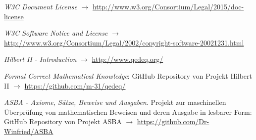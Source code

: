 \documentclass[english,ngerman,parskip=half,headsepline,footsepline]{scrreprt}
\begin{document}
\begin{flushleft}
\begin{thebibliography}{12}
			\emph{W3C Document License} $\rightarrow$ \url{http://www.w3.org/Consortium/Legal/2015/doc-license}
			
			\emph{W3C Software Notice and License} $\rightarrow$ \url{http://www.w3.org/Consortium/Legal/2002/copyright-software-20021231.html}
			
			\emph{Hilbert II - Introduction} $\rightarrow$ \url{http://www.qedeq.org/}
			
			\emph{Formal Correct Mathematical Knowledge}: GitHub Repository von Projekt Hilbert II $\rightarrow$ \url{https://github.com/m-31/qedeq/}
			
			\emph{ASBA - Axiome, Sätze, Beweise und Ausgaben}. Projekt zur maschinellen Überprüfung von mathematischen Beweisen und deren Ausgabe in lesbarer Form: GitHub Repository von Projekt ASBA $\rightarrow$ \url{https://github.com/Dr-Winfried/ASBA}
			
		\end{thebibliography}
	\end{flushleft}
	\thispagestyle{scrheadings}
	
\end{document}
